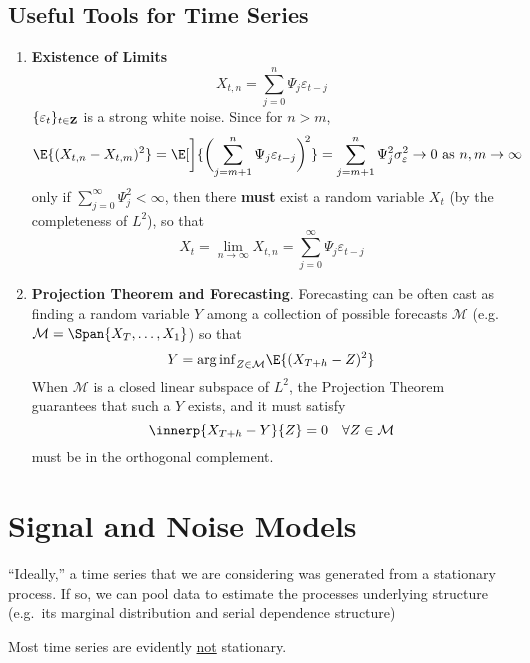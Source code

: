 \subsection{Useful Tools for Time Series}
\begin{enumerate}[(1)]
    \item \textbf{Existence of Limits}
          \[ X_{t,n}=\sum_{j=0}^{n} \Psi_j \varepsilon_{t-j}
          \]
          $ \{\varepsilon_t\}_{t\in\mathbf{Z}} $ is a strong white noise.
          Since for $ n>m $,
          \[ \E{(X_{t,n}-X_{t,m})^2}
              =\E[\bigg]{\biggl(\sum_{j=m+1}^{n} \Psi_j \varepsilon_{t-j}\biggr)^{\!2}}
              =\sum_{j=m+1}^{n} \Psi_j^2\sigma_{\varepsilon}^2\to 0\text{ as }
              n,m\to \infty \]
          only if $ \sum_{j=0}^{\infty} \Psi_j^2<\infty $, then there \textbf{must}
          exist a random variable $ X_t $ (by the completeness of $ L^2 $), so that
          \[ X_t=\lim\limits_{{n} \to {\infty}} X_{t,n}=\sum_{j=0}^{\infty}
              \Psi_j \varepsilon_{t-j} \]
    \item \textbf{Projection Theorem and Forecasting}.
          Forecasting can be often cast as finding a random variable $ Y $ among
          a collection of possible forecasts $ \mathcal{M} $ (e.g.
          $ \mathcal{M}=\Span{X_T,\ldots,X_1} $) so that
          \[ Y={\arg\inf}_{Z\in\mathcal{M}}\E{(X_{T+h}-Z)^2} \]
          When $ \mathcal{M} $ is a closed linear subspace of $ L^2 $,
          the Projection Theorem guarantees that such a $ Y $ exists,
          and it must satisfy
          \[ \innerp{X_{T+h}-Y}{Z}=0\quad\forall Z\in\mathcal{M} \]
          must be in the orthogonal complement.
\end{enumerate}

\section{Signal and Noise Models}
``Ideally,'' a time series that we are considering
was generated from a stationary process. If so,
we can pool data to estimate the processes underlying structure
(e.g.\ its marginal distribution and serial dependence structure)

Most time series are evidently \underline{not} stationary.

